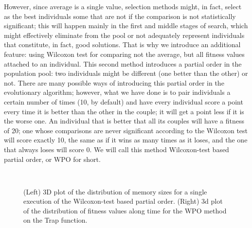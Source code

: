 \documentclass{llncs}
\begin{document}
However, since average is a single value, selection methods might, in
fact, select as the best individuals some that are not if the comparison
is not statistically significant; this will happen mainly in the first
and middle stages of search, which might effectively eliminate from
the pool or not adequately represent individuals that constitute, in
fact, good solutions. That is why we introduce an additional feature:
using Wilcoxon test \cite{wilcoxon:1945}
for comparing not the average, but all
fitness values attached to an individual. This second method
introduces a partial order in the population pool: two individuals
might be different (one better than the other) or not. There are many
possible ways of introducing this partial order in the evolutionary
algorithm; however, what we have done is to pair individuals a certain
number of times (10, by default) and have every individual score a
point every time it is better than the other in the couple; it will
get a point less if it is the worse one. An individual that is better
that all its couples will have a fitness of 20; one whose comparisons
are never significant according to the Wilcoxon test will score
exactly 10, the same as if it wins as many times as it loses, and the
one that always loses will score 0. We will call this method
Wilcoxon-test based partial order, or {\sf WPO} for short.
%
\begin{figure}[ht!b]
\centering
{}
~
\caption{(Left) 3D plot of the distribution of memory sizes for a single
execution of the Wilcoxon-test based partial order. (Right)
3d plot of the distribution of fitness values along time for the WPO
method on the Trap function. \label{fig:initial}}
\end{figure}
\end{document}
